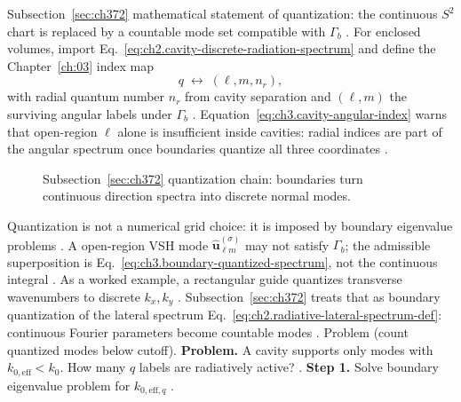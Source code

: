 Subsection~\ref{sec:ch372} mathematical statement of quantization: the continuous \(S^{2}\) chart is replaced by a
countable mode set compatible with \(\Gamma_{b}\) \cite{hansen1988}.
For enclosed volumes, import Eq.~\eqref{eq:ch2.cavity-discrete-radiation-spectrum} and define the Chapter~\ref{ch:03}
index map
\begin{equation}
\label{eq:ch3.cavity-angular-index}
q\;\longleftrightarrow\;(\ell,m,n_{r}),
\end{equation}
with radial quantum number \(n_{r}\) from cavity separation and \((\ell,m)\) the surviving angular labels under
\(\Gamma_{b}\) \cite{stratton1941}. Equation~\eqref{eq:ch3.cavity-angular-index} warns that open-region
\(\ell\) alone is insufficient inside cavities: radial indices are part of the angular spectrum once boundaries quantize
all three coordinates \cite{harrington2001}.
\begin{figure}[t]
\centering
{}
\caption{Subsection~\ref{sec:ch372} quantization chain: boundaries turn continuous direction spectra into discrete
normal modes.}
\label{fig:ch3.372-quantization-chain}
\end{figure}
Quantization is not a numerical grid choice: it is imposed by boundary eigenvalue problems \cite{stratton1941}.
A open-region VSH mode \(\widehat{\mathbf{u}}_{\ell m}^{(\sigma)}\) may not satisfy \(\Gamma_{b}\); the admissible
superposition is Eq.~\eqref{eq:ch3.boundary-quantized-spectrum}, not the continuous integral
\cite{harrington2001}.
As a worked example, a rectangular guide quantizes transverse wavenumbers to discrete \(k_{x},k_{y}\) \cite{jackson1999}.
Subsection~\ref{sec:ch372} treats that as boundary quantization of the lateral spectrum
Eq.~\eqref{eq:ch2.radiative-lateral-spectrum-def}: continuous Fourier parameters become countable modes
\cite{stratton1941}.
Problem (count quantized modes below cutoff). \textbf{Problem.} A cavity supports only modes with \(k_{0,\mathrm{eff}}<k_{0}\). How many \(q\) labels are radiatively
active? \cite{stratton1941}.
\textbf{Step 1.} Solve boundary eigenvalue problem for \(k_{0,\mathrm{eff},q}\) \cite{jackson1999}.
